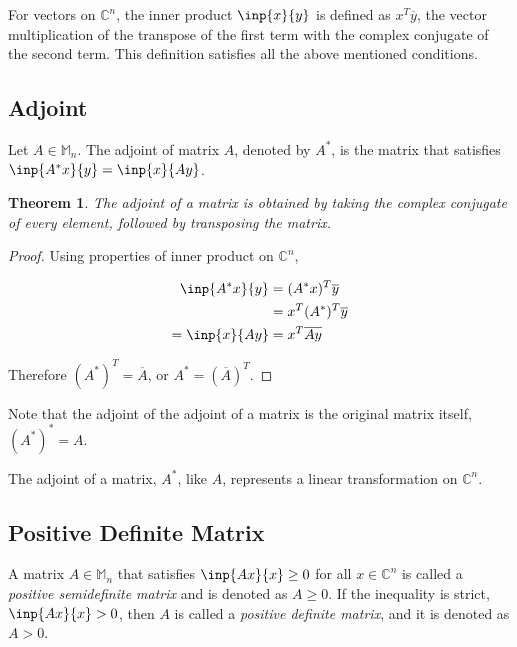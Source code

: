 \documentclass[twofold]{article}
\newcommand*\conj[1]{\overline{#1}}
\newcommand*\adj[1]{#1^*}
\newcommand*\trp[1]{#1^T}
\theoremstyle{plain}
\newtheorem{theorem}{Theorem}
\theoremstyle{definition}
\theoremstyle{remark}
\begin{document}
For vectors on \(\mathbb{C}^n\), the inner product \(\inp{x}{y}\) is defined as \(\trp{x} \conj{y}\), the vector multiplication of the transpose of the first term with the complex conjugate of the second term. This definition satisfies all the above mentioned conditions.


\subsection{Adjoint}

Let \(A \in \mathbb{M}_n\). The adjoint of matrix \(A\), denoted by \(\adj{A}\), is the matrix that  satisfies \(\inp{\adj{A}x}{y} = \inp{x}{Ay}\). 

\begin{theorem} The adjoint of a matrix is obtained by taking the complex conjugate of every element, followed by transposing the matrix. \end{theorem}


\begin{proof} Using properties of inner product on \(\mathbb{C}^n\),

\begin{equation*} \begin{split}
\inp{\adj{A}x}{y} & = \trp{(\adj{A}x)} \conj{y}  \\
& = \trp{x} \trp{(\adj{A})} \conj{y}\\
= \inp{x}{Ay} & = \trp{x} \conj{Ay} 
\end{split} \end{equation*}

Therefore \(\trp{(\adj{A})} = \conj{A}\), or \(\adj{A} = \trp{(\conj{A})}\). \end{proof}

Note that the adjoint of the adjoint of a matrix is the original matrix itself, \(\adj{(\adj{A})} = A\).

The adjoint of a matrix, \(\adj{A}\), like \(A\), represents a linear transformation on \(\mathbb{C}^n\).


\subsection{Positive Definite Matrix}

A matrix \(A\in \mathbb{M}_n\) that satisfies \(\inp{Ax}{x} \ge 0\) for all \(x \in \mathbb{C}^n\) is called a {\em positive semidefinite matrix} and is denoted as \(A \ge 0\). If the inequality is strict, \(\inp{Ax}{x} > 0\), then \(A\) is called a {\em positive definite matrix}, and it is denoted as \(A > 0\). 
\end{document}

